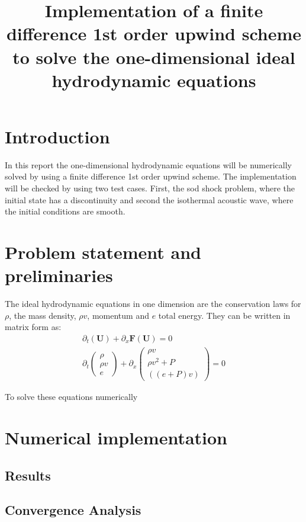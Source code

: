 \documentclass[12pt,a4paper]{article}
\title{Implementation of a finite difference 1st order upwind scheme to solve the one-dimensional ideal hydrodynamic equations}
\begin{document}
\maketitle

\section{Introduction}
In this report the one-dimensional hydrodynamic equations will be numerically solved by using a finite difference 1st order upwind scheme. The implementation will be checked by using two test cases. First, the sod shock problem, where the initial state has a discontinuity and second the isothermal acoustic wave, where the initial conditions are smooth. 

\section{Problem statement and preliminaries}
The ideal hydrodynamic equations in one dimension are the conservation laws for $\rho$, the mass density, $\rho v$, momentum and $e$ total energy. They can be written in matrix form as:
\begin{align}
\partial_{t}\left(\textbf{U}\right) + \partial_{x}\textbf{F}\left(\textbf{U}\right) = 0 \\
\partial_{t}\begin{pmatrix} \rho \\
\rho v \\
e
\end{pmatrix}
+
\partial_{x}\begin{pmatrix} \rho v \\
\rho v^{2} + P \\
\left((e + P) v\right)
\end{pmatrix} = 0 \label{cons_1D}
\end{align}

To solve these equations numerically 
\section{Numerical implementation}

\subsection{Results}

\subsection{Convergence Analysis}
\end{document}
